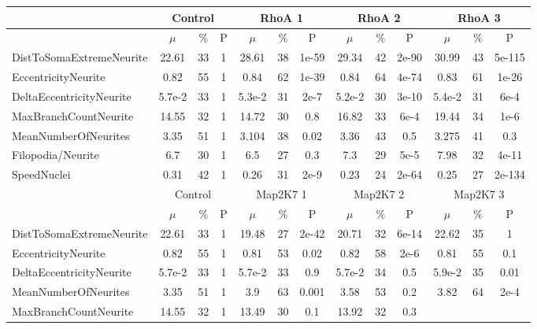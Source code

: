 \documentclass[12pt]{article}
\begin{document}
\thispagestyle{empty}

\begin{sidewaystable}
  \begin{tabular}{|l||ccc||ccc||ccc||ccc|}
    \hline
    & \multicolumn{3}{|c|}{  Control  } &  \multicolumn{3}{|c|}{  RhoA 1  } &
    \multicolumn{3}{|c|}{   RhoA 2  }   &  \multicolumn{3}{|c|}{   RhoA 3  }  \\
    \hline
    & $\mu$ & $\%$ & P     & $\mu$ & $\%$ & P     & $\mu$ & $\%$ & P     & $\mu$
    & $\%$ & P \\
    \hline
    DistToSomaExtremeNeurite &  22.61 & 33 &  1 & 28.61 &  38 & 1e-59&  29.34 & 42&
    2e-90& 30.99 & 43& 5e-115 \\
    EccentricityNeurite & 0.82 & 55 & 1 &  0.84 & 62 & 1e-39 &0.84 & 64& 4e-74 &
    0.83 & 61 & 1e-26 \\
    DeltaEccentricityNeurite  & 5.7e-2  &33 &1  & 5.3e-2  &31 &2e-7  &5.2e-2 &30
    &3e-10 &5.4e-2 &31 & 6e-4 \\
    \hline
    MaxBranchCountNeurite &14.55  & 32  & 1 &  14.72 &  30 & 0.8  & 16.82   & 33
    &6e-4 &19.44 & 34 & 1e-6 \\
    MeanNumberOfNeurites &3.35 &51 &1 & 3.104 & 38 &0.02 &3.36 &43 &0.5 & 3.275 &41 &0.3 \\
    Filopodia/Neurite &6.7 &30 &1 & 6.5 &27 &0.3 &7.3 &29 &5e-5 &7.98 &32 &4e-11 \\
    SpeedNuclei &0.31 & 42  & 1 &0.26 & 31 & 2e-9 &0.23 &24  & 2e-64 &0.25 &27 &
    2e-134 \\
    \hline \hline
    & \multicolumn{3}{|c|}{  Control  } &  \multicolumn{3}{|c|}{  Map2K7 1  } &
    \multicolumn{3}{|c|}{   Map2K7 2  }   &  \multicolumn{3}{|c|}{   Map2K7 3  }  \\
    \hline
    & $\mu$ & $\%$ & P     & $\mu$ & $\%$ & P     & $\mu$ & $\%$ & P     & $\mu$
    & $\%$ & P \\
    \hline
    DistToSomaExtremeNeurite  &  22.61 & 33 &  1 &  19.48 & 27 & 2e-42 & 20.71 & 32
    & 6e-14 & 22.62 & 35 & 1 \\
    EccentricityNeurite  & 0.82 & 55 & 1 & 0.81 & 53 & 0.02 &  0.82 & 58 & 2e-6
    &0.81 & 55 & 0.1  \\
    DeltaEccentricityNeurite & 5.7e-2 &33 &1  & 5.7e-2 &33 &0.9 &5.7e-2 &34 &0.5
    &5.9e-2 &35 & 0.01\\
    MeanNumberOfNeurites &3.35 &51 &1 &3.9 &63 &0.001 &3.58 &53 &0.2 &3.82  &64 &2e-4 \\
    \hline
    MaxBranchCountNeurite &14.55  & 32 &  1 & 13.49   & 30 &0.1 &13.92  &32 &0.3

\end{tabular}
\end{sidewaystable}
\end{document}

